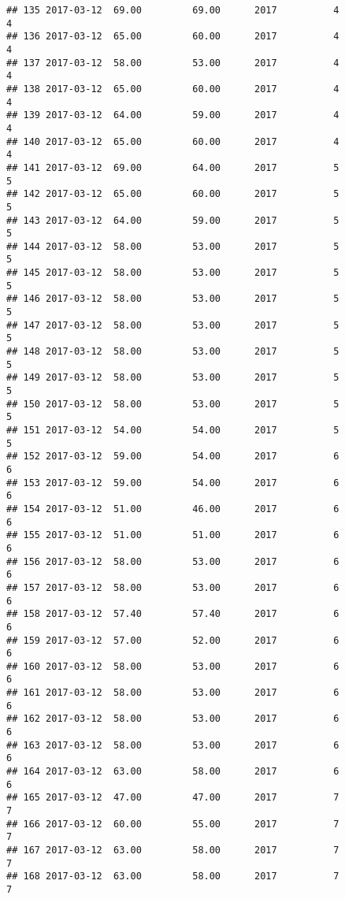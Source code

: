 \documentclass[]{article}
\begin{document}
\begin{verbatim}
## 135 2017-03-12  69.00         69.00      2017          4                 4
## 136 2017-03-12  65.00         60.00      2017          4                 4
## 137 2017-03-12  58.00         53.00      2017          4                 4
## 138 2017-03-12  65.00         60.00      2017          4                 4
## 139 2017-03-12  64.00         59.00      2017          4                 4
## 140 2017-03-12  65.00         60.00      2017          4                 4
## 141 2017-03-12  69.00         64.00      2017          5                 5
## 142 2017-03-12  65.00         60.00      2017          5                 5
## 143 2017-03-12  64.00         59.00      2017          5                 5
## 144 2017-03-12  58.00         53.00      2017          5                 5
## 145 2017-03-12  58.00         53.00      2017          5                 5
## 146 2017-03-12  58.00         53.00      2017          5                 5
## 147 2017-03-12  58.00         53.00      2017          5                 5
## 148 2017-03-12  58.00         53.00      2017          5                 5
## 149 2017-03-12  58.00         53.00      2017          5                 5
## 150 2017-03-12  58.00         53.00      2017          5                 5
## 151 2017-03-12  54.00         54.00      2017          5                 5
## 152 2017-03-12  59.00         54.00      2017          6                 6
## 153 2017-03-12  59.00         54.00      2017          6                 6
## 154 2017-03-12  51.00         46.00      2017          6                 6
## 155 2017-03-12  51.00         51.00      2017          6                 6
## 156 2017-03-12  58.00         53.00      2017          6                 6
## 157 2017-03-12  58.00         53.00      2017          6                 6
## 158 2017-03-12  57.40         57.40      2017          6                 6
## 159 2017-03-12  57.00         52.00      2017          6                 6
## 160 2017-03-12  58.00         53.00      2017          6                 6
## 161 2017-03-12  58.00         53.00      2017          6                 6
## 162 2017-03-12  58.00         53.00      2017          6                 6
## 163 2017-03-12  58.00         53.00      2017          6                 6
## 164 2017-03-12  63.00         58.00      2017          6                 6
## 165 2017-03-12  47.00         47.00      2017          7                 7
## 166 2017-03-12  60.00         55.00      2017          7                 7
## 167 2017-03-12  63.00         58.00      2017          7                 7
## 168 2017-03-12  63.00         58.00      2017          7                 7

\end{verbatim}
\end{document}
